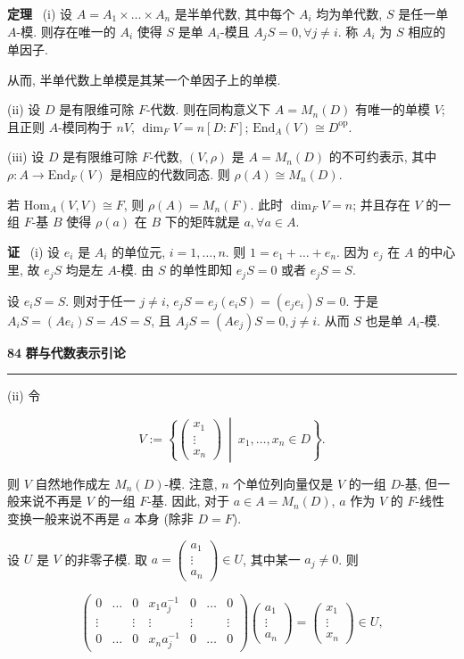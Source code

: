 \documentclass[11pt,a4paper]{article}
\begin{document}
\textbf{定理} \ (i) 设 $A = A_1 \times \dots \times A_n$ 是半单代数, 其中每个 $A_i$ 均为单代数, $S$ 是任一单 $A$-模. 则存在唯一的 $A_i$ 使得 $S$ 是单 $A_i$-模且 $A_j S = 0, \forall j \neq i$. 称 $A_i$ 为 $S$ 相应的单因子.

从而, 半单代数上单模是其某一个单因子上的单模.

(ii) 设 $D$ 是有限维可除 $F$-代数. 则在同构意义下 $A = M_n(D)$ 有唯一的单模 $V$; 且正则 $A$-模同构于 $nV$, $\dim_F V = n[D:F]$; $\mathrm{End}_A(V) \cong D^{\mathrm{op}}$.

(iii) 设 $D$ 是有限维可除 $F$-代数, $(V, \rho)$ 是 $A = M_n(D)$ 的不可约表示, 其中 $\rho : A \to \mathrm{End}_F(V)$ 是相应的代数同态. 则 $\rho(A) \cong M_n(D)$.

若 $\mathrm{Hom}_A(V, V) \cong F$, 则 $\rho(A) = M_n(F)$. 此时 $\dim_F V = n$; 并且存在 $V$ 的一组 $F$-基 $B$ 使得 $\rho(a)$ 在 $B$ 下的矩阵就是 $a, \forall a \in A$.

\textbf{证} \ (i) 设 $e_i$ 是 $A_i$ 的单位元, $i = 1, \dots, n$. 则 $1 = e_1 + \dots + e_n$. 因为 $e_j$ 在 $A$ 的中心里, 故 $e_j S$ 均是左 $A$-模. 由 $S$ 的单性即知 $e_j S = 0$ 或者 $e_j S = S$.

设 $e_i S = S$. 则对于任一 $j \neq i$, $e_j S = e_j(e_i S) = (e_j e_i) S = 0$. 于是 $A_i S = (A e_i) S = A S = S$, 且 $A_j S = (A e_j) S = 0, j \neq i$. 从而 $S$ 也是单 $A_i$-模.

\newpage
\noindent \textbf{84} \hfill \textbf{群与代数表示引论}
\vspace{0.5em} \hrule \vspace{1.5em}

(ii) 令

$$
V := \left\{ \begin{pmatrix} x_1 \\ \vdots \\ x_n \end{pmatrix} \ \middle| \ x_1, \dots, x_n \in D \right\}.
$$

则 $V$ 自然地作成左 $M_n(D)$-模. 注意, $n$ 个单位列向量仅是 $V$ 的一组 $D$-基, 但一般来说不再是 $V$ 的一组 $F$-基. 因此, 对于 $a \in A = M_n(D)$, $a$ 作为 $V$ 的 $F$-线性变换一般来说不再是 $a$ 本身 (除非 $D=F$).

设 $U$ 是 $V$ 的非零子模. 取 $a = \begin{pmatrix} a_1 \\ \vdots \\ a_n \end{pmatrix} \in U$, 其中某一 $a_j \neq 0$. 则

$$
\begin{pmatrix}
0 & \dots & 0 & x_1 a_j^{-1} & 0 & \dots & 0 \\
\vdots & & \vdots & \vdots & \vdots & & \vdots \\
0 & \dots & 0 & x_n a_j^{-1} & 0 & \dots & 0
\end{pmatrix}
\begin{pmatrix} a_1 \\ \vdots \\ a_n \end{pmatrix}
= \begin{pmatrix} x_1 \\ \vdots \\ x_n \end{pmatrix} \in U,
$$
\end{document}
